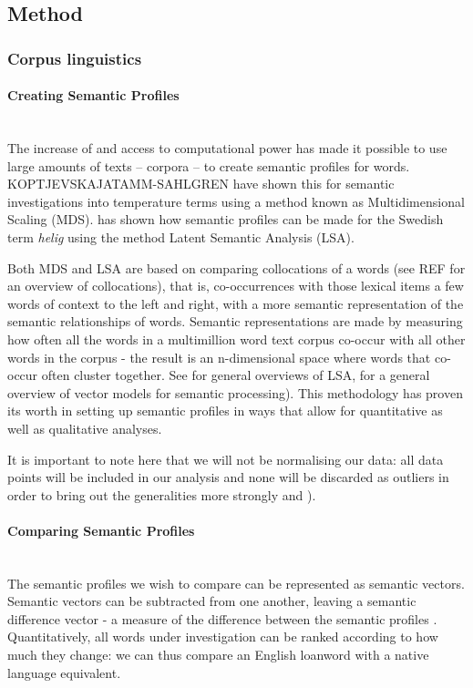 \documentclass[a4paper]{article}
\begin{document}

\subsection{Method}


\subsubsection{Corpus linguistics}

\paragraph{Creating Semantic Profiles} \hspace{0pt} \\
The increase of and access to computational power has made it possible to use large amounts of texts -- corpora -- to create semantic profiles for words. KOPTJEVSKAJATAMM-SAHLGREN have shown this for semantic investigations into temperature terms using a method known as Multidimensional Scaling (MDS). \citet{Sikstrom2012} has shown how semantic profiles can be made for the Swedish term \textit{helig} using the method Latent Semantic Analysis (LSA). 

Both MDS and LSA are based on comparing collocations of a words (see REF for an overview of collocations), that is, co-occurrences with those lexical items a few words of context to the left and right, with a more semantic representation of the semantic relationships of words. Semantic representations are made by measuring how often all the words in a multimillion word text corpus co-occur with all other words in the corpus - the result is an n-dimensional space where words that co-occur often cluster together. See \citet{Deerwester1990,Dumais2004} for general overviews of LSA, \citet{Turney2010} for a general overview of vector models for semantic processing). This methodology has proven its worth in setting up semantic profiles in ways that allow for quantitative as well as qualitative analyses.

It is important to note here that we will not be normalising our data: all data points will be included in our analysis and none will be discarded as outliers in order to bring out the generalities more strongly \citep*[cf.][p.678]{Walchli2012} and \citet*[p.293]{Bernardini2002}).

\paragraph{Comparing Semantic Profiles} \hspace{0pt} \\
The semantic profiles we wish to compare can be represented as semantic vectors. Semantic vectors can be subtracted from one another, leaving a semantic difference vector - a measure of the difference between the semantic profiles \citep[cf.][p.19]{Sikstrom2012}. Quantitatively, all words under investigation can be ranked according to how much they change: we can thus compare an English loanword with a native language equivalent. 
\end{document}
